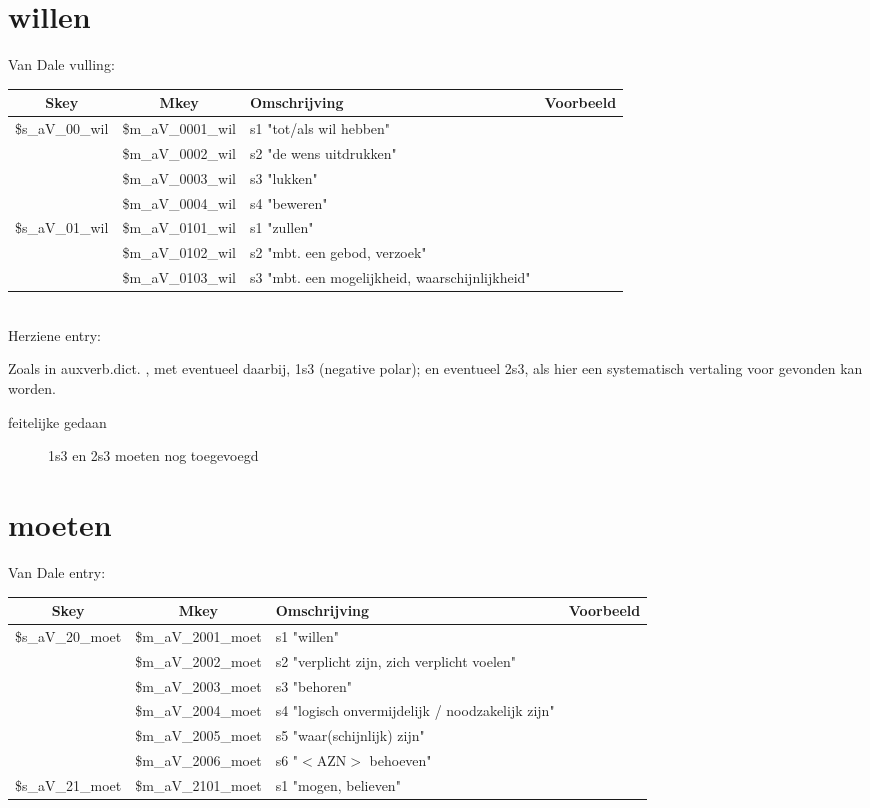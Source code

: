 \section{willen}
Van Dale vulling:\\
\begin{tabular}[t]{|c|c|p{}|p{}|}
\hline
Skey          & Mkey              & Omschrijving & Voorbeeld\\
\hline
\$s\_aV\_00\_wil  & \$m\_aV\_0001\_wil    & s1 "tot/als wil hebben"&\\
              & \$m\_aV\_0002\_wil    & s2 "de wens uitdrukken"&\\
              & \$m\_aV\_0003\_wil    & s3 "lukken"&\\
              & \$m\_aV\_0004\_wil    & s4 "beweren"&\\
\$s\_aV\_01\_wil  & \$m\_aV\_0101\_wil    & s1 "zullen"&\\
              & \$m\_aV\_0102\_wil    & s2 "mbt. een gebod, verzoek"&\\
              & \$m\_aV\_0103\_wil    & s3 "mbt. een mogelijkheid, waarschijnlijkheid"&\\
\hline
\end{tabular}\\

Herziene entry:

Zoals in auxverb.dict. , met eventueel daarbij, 1s3 (negative polar); en eventueel 2s3, als hier een systematisch vertaling voor
gevonden kan worden.


\begin{description}
\item[feitelijke gedaan] 1s3 en 2s3 moeten nog toegevoegd
\end{description}


\newpage
\section{moeten}


Van Dale entry:

\begin{tabular}[t]{|c|c|p{}|p{}|}
\hline
Skey          & Mkey              & Omschrijving & Voorbeeld\\
\hline
\$s\_aV\_20\_moet & \$m\_aV\_2001\_moet   & s1 "willen"&\\
              & \$m\_aV\_2002\_moet   & s2 "verplicht zijn, zich verplicht voelen"&\\
              & \$m\_aV\_2003\_moet   & s3 "behoren"&\\
              & \$m\_aV\_2004\_moet   & s4 "logisch onvermijdelijk / noodzakelijk zijn"&\\
              & \$m\_aV\_2005\_moet   & s5 "waar(schijnlijk) zijn"&\\
              & \$m\_aV\_2006\_moet   & s6 "$<$AZN$>$ behoeven"&\\
\$s\_aV\_21\_moet & \$m\_aV\_2101\_moet   & s1 "mogen, believen"&\\
\hline
\end{tabular}\\

